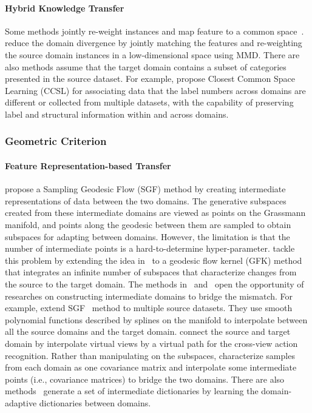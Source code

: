 \documentclass[prodmode]{acmsmall}  %
\begin{document}
\paragraph{Hybrid Knowledge Transfer}
Some methods jointly re-weight instances and map feature to a common space~\cite{Long2014,Hsu2015}.  reduce the domain divergence by jointly matching the features and re-weighting the source domain instances in a low-dimensional space using MMD. 
There are also methods assume that the target domain contains a subset of categories presented in the source dataset. For example,  propose Closest Common Space Learning (CCSL) for associating data that the label numbers across domains are different or collected from multiple datasets, with the capability of preserving label and structural information within and across domains.

\subsubsection{Geometric Criterion}
\paragraph{Feature Representation-based Transfer}
 propose a Sampling Geodesic Flow (SGF) method by creating intermediate representations of data between the two domains. The generative subspaces created from these intermediate domains are viewed as points on the Grassmann manifold, and points along the geodesic between them are sampled to obtain subspaces for adapting between domains. However, the limitation is that the number of intermediate points is a hard-to-determine hyper-parameter.  tackle this problem by extending the idea in~\cite{Gopalan2011} to a geodesic flow kernel (GFK) method that integrates an infinite number of subspaces that characterize changes from the source to the target domain. The methods in~\cite{Gopalan2011,Gopalan2014} and~\cite{Gong2012,Gong2014} open the opportunity of researches on constructing intermediate domains to bridge the mismatch. For example,  extend SGF~\cite{Gopalan2011} method to multiple source datasets. They use smooth polynomial functions described by splines on the manifold to interpolate between all the source domains and the target domain.  connect the source and target domain by interpolate virtual views by a virtual path for the cross-view action recognition. Rather than manipulating on the subspaces,  characterize samples from each domain as one covariance matrix and interpolate some intermediate points (i.e., covariance matrices) to bridge the two domains. There are also methods~\cite{Ni2013,Xu2015} generate a set of intermediate dictionaries by learning the domain-adaptive dictionaries between domains. 
\end{document}

